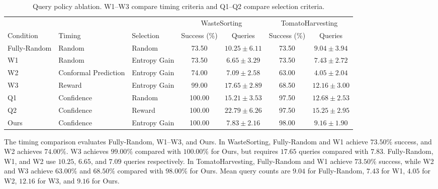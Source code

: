\begin{table}[t]
\centering
\caption{Query policy ablation. W1--W3 compare timing criteria and Q1--Q2 compare selection criteria.}
\label{tab:policy_ablation}
\label{tab:when_what_random}
\small
\setlength{\tabcolsep}{4pt}
\begin{tabular}{lllcccc}
\toprule
 & & & \multicolumn{2}{c}{WasteSorting} & \multicolumn{2}{c}{TomatoHarvesting} \\
\cmidrule(lr){4-5}\cmidrule(lr){6-7}
Condition & Timing & Selection & Success (\%) & Queries & Success (\%) & Queries \\
\midrule
Fully-Random & Random & Random & 73.50 & $10.25 \pm 6.11$ & 73.50 & $9.04 \pm 3.94$ \\
W1 & Random & Entropy Gain & 73.50 & $6.65 \pm 3.29$ & 73.50 & $7.43 \pm 2.72$ \\
W2 & Conformal Prediction & Entropy Gain & 74.00 & $7.09 \pm 2.58$ & 63.00 & $4.05 \pm 2.04$ \\
W3 & Reward & Entropy Gain & 99.00 & $17.65 \pm 2.89$ & 68.50 & $12.16 \pm 3.00$ \\
Q1 & Confidence & Random & 100.00 & $15.21 \pm 3.53$ & 97.50 & $12.68 \pm 2.53$ \\
Q2 & Confidence & Reward & 100.00 & $22.79 \pm 6.26$ & 97.50 & $15.25 \pm 2.95$ \\
Ours & Confidence & Entropy Gain & 100.00 & $7.83 \pm 2.16$ & 98.00 & $9.16 \pm 1.90$ \\
\bottomrule
\end{tabular}
\end{table}

The timing comparison evaluates Fully-Random, W1--W3, and Ours. In WasteSorting, Fully-Random and W1 achieve $73.50\%$ success, and W2 achieves $74.00\%$. W3 achieves $99.00\%$ compared with $100.00\%$ for Ours, but requires $17.65$ queries compared with $7.83$. Fully-Random, W1, and W2 use $10.25$, $6.65$, and $7.09$ queries respectively. In TomatoHarvesting, Fully-Random and W1 achieve $73.50\%$ success, while W2 and W3 achieve $63.00\%$ and $68.50\%$ compared with $98.00\%$ for Ours. Mean query counts are $9.04$ for Fully-Random, $7.43$ for W1, $4.05$ for W2, $12.16$ for W3, and $9.16$ for Ours.

